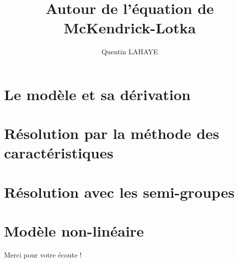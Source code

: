 \documentclass[10pt,svgnames,fragile]{beamer}
\subtitle{}
\institute[]{} \usetheme{CambridgeUS}
\author{Quentin LAHAYE}
\date{}
\title{Autour de l'équation de McKendrick-Lotka}
\begin{document}
\maketitle

\footnotesize



\scriptsize\tableofcontents

\footnotesize

\section{Le modèle et sa dérivation}


\section{Résolution par la méthode des caractéristiques}



\section{Résolution avec les semi-groupes}



\section{Modèle non-linéaire}


%

\begin{frame}
    \begin{center}
        \Large Merci pour votre écoute !
    \end{center}
\end{frame}
\end{document}
